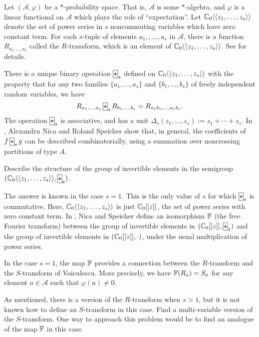 \documentclass[12pt,letterpaper, reqno]{amsart}
\newcommand{\A}{\mathcal A}
\newcommand{\freestar}{ \framebox[7pt]{$\star$} }
\begin{document}
\begin{problemblock}  
Let $(\A,\varphi)$ be a $*$-probability space. That is, $\A$ is some $*$-algebra, and $\varphi$ is a linear functional on $\A$ which plays the role of ``expectation''. Let $\mathbb C_0\langle\langle z_1,\ldots,z_s\rangle\rangle$ denote the set of power series in $s$ noncommuting variables which have zero constant term. For each $s$-tuple of elements $a_1,,\ldots,a_s$ in $\A$, there is a function $R_{a_1,\ldots,a_s}$ called the  {\sf $R$-transform}, which is an element of $\mathbb C_0\langle\langle z_1,\ldots,z_s\rangle\rangle$. See \cite{nica-speicher:ntuples} for details.

There is a unique binary operation $\freestar_s$ defined on $\mathbb C_0\langle\langle z_1,\ldots,z_s\rangle\rangle$ with the property that for any two families $\{a_1,\ldots,a_s\}$ and $\{b_1,\ldots,b_s\}$ of freely independent random variables, we have
\begin{equation*}
R_{a_1,\ldots,a_s}\,\freestar_s\, R_{b_1,\ldots,b_s} = R_{a_1b_1,\ldots,a_sb_s}.
\end{equation*}
The operation $\freestar_s$ is associative, and has a unit $\Delta_s(z_1,\ldots,z_s):= z_1+\cdots +z_s$. In \cite{nica-speicher:ntuples}, Alexandru Nica and Roland Speicher show that, in general, the coefficients of $f\,\freestar_s \,g$ can be described combinatorially, using a summation over noncrossing partitions of type $A$.

\begin{problem}
Describe the structure of the group of
invertible elements in the
semigroup
$( \C_0\langle\langle z_1,\ldots,z_s\rangle\rangle,\freestar_s )$.\end{problem}

\begin{remark}
The answer is known in the case $s=1$. This is the only value of $s$ for which $\freestar_s$ is commutative. Here, $\mathbb C_0\langle\langle z_1,\ldots,z_s\rangle\rangle$ is just $\mathbb C_0[[z]]$, the set of power series with zero constant term. In \cite{nica-speicher:fourier}, Nica and Speicher define an isomorphism $\mathbb F$ (the {\sf free Fourier transform}) between the group of invertible elements in $(\C_0[[z]], \freestar_1)$ and the group of invertible elements in $(\mathbb C_0[[z]], \cdot)$, under the usual multiplication of power series.
\end{remark}

\begin{remark}In the case $s=1$, the map $\mathbb F$ provides a connection between the $R$-transform and the {\sf $S$-transform} of Voiculescu. More precisely, we have $\mathbb F(R_a)=S_a$ for any element $a\in\A$ such that $\varphi(a)\neq 0$.

As mentioned, there is a version of the $R$-transform when $s>1$, but it is not known how to define an $S$-transform in this case. Find a multi-variable version of the $S$-transform. One way to approach this problem would be to find an analogue of the map $\mathbb F$ in this case.
\end{remark}

\end{problemblock}
\end{document}
